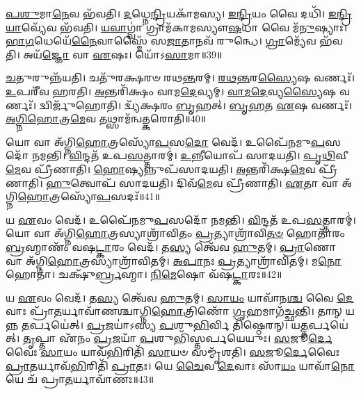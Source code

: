 \-\ul{𑌪}\-\-\ul{𑌶𑍁}\-𑌮𑌾\-\ul{𑌨𑍇}\-𑌵 𑌭᳴𑌵𑌤𑌿।
\-\ul{𑌦}\-𑌧𑍍𑌨𑍇\-\ul{𑌨𑍍𑌦𑍍𑌰𑌿}\-𑌯𑌕𑌾᳴𑌮𑌸𑍍𑌯।
\-\ul{𑌇}\-\-\ul{𑌨𑍍𑌦𑍍𑌰𑌿}\-𑌯𑌂 𑌵𑍈 𑌦𑌧𑌿᳴।
\-\ul{𑌇}\-\-\ul{𑌨𑍍𑌦𑍍𑌰𑌿}\-\-\ul{𑌯𑌾}\-𑌵𑍍𑌯𑍇᳴𑌵 𑌭᳴𑌵𑌤𑌿।
\-\ul{𑌯}\-\-\ul{𑌵𑌾}\-𑌗𑍍𑌵𑌾॑ 𑌗𑍍𑌰𑌾𑌮᳴𑌕𑌾𑌮𑌸𑍍𑌯𑍗\-\ul{𑌷}\-𑌧𑌾 𑌵𑍈 𑌮᳴\-\ul{𑌨𑍁}\-𑌷𑍍𑌯𑌾𑌃॑।
\-\ul{𑌭𑌾}\-\-\ul{𑌗}\-𑌧𑍇𑌯𑍇᳴\-\ul{𑌨𑍈}\-𑌵𑌾𑌸𑍍𑌮𑍈᳴ 𑌸\-\ul{𑌜𑌾}\-𑌤𑌾𑌨𑌵᳴ 𑌰𑍁𑌨𑍍𑌧𑍇।
\-\ul{𑌗𑍍𑌰𑌾}\-𑌮𑍍𑌯𑍇᳴𑌵 𑌭᳴𑌵𑌤𑌿।
𑌅𑌯᳴\-\ul{𑌜𑍍𑌞𑍋} 𑌵𑌾 \ul{𑌏}\-𑌷𑌃।
𑌯𑍋᳴𑌽\-\ul{𑌸𑌾}\-𑌮𑌾॥39॥

\-\ul{𑌚}\-𑌤𑍁𑌰𑍁𑌨𑍍𑌨᳴𑌯𑌤𑌿।
𑌚𑌤𑍁᳴𑌰𑌕𑍍𑌷𑌰𑍞 𑌰𑌥\-\ul{𑌨𑍍𑌤}\-𑌰𑌮𑍍।
\-\ul{𑌰}\-\-\ul{𑌥}\-\-\ul{𑌨𑍍𑌤}\-𑌰\-\ul{𑌸𑍍𑌯𑍈}\-𑌷 𑌵𑌰𑍍𑌣𑌃᳴।
\-\ul{𑌉}\-𑌪𑌰𑍀᳴𑌵 𑌹𑌰𑌤𑌿।
\-\ul{𑌅}\-𑌨𑍍𑌤𑌰𑌿᳴𑌕𑍍𑌷𑌂 𑌵𑌾𑌮\-\ul{𑌦𑍇}\-𑌵𑍍𑌯𑌮𑍍।
\-\ul{𑌵𑌾}\-\-\ul{𑌮}\-\-\ul{𑌦𑍇}\-𑌵𑍍𑌯\-\ul{𑌸𑍍𑌯𑍈}\-𑌷 𑌵𑌰𑍍𑌣𑌃᳴।
𑌦𑍍𑌵𑌿𑌰𑍍𑌜𑍁᳴𑌹𑍋𑌤𑌿।
𑌦𑍍𑌵𑍍𑌯᳴𑌕𑍍𑌷𑌰𑌂 \ul{𑌬𑍃}\-𑌹𑌤𑍍।
\-\ul{𑌬𑍃}\-\-\ul{𑌹}\-𑌤 \ul{𑌏}\-𑌷 𑌵𑌰𑍍𑌣𑌃᳴।
\-\ul{𑌅}\-\-\ul{𑌗𑍍𑌨𑌿}\-\-\ul{𑌹𑍋}\-𑌤𑍍𑌰\-\ul{𑌮𑍇}\-𑌵 𑌤𑌥𑍍𑌸𑌾𑌮᳴𑌨𑍍𑌵𑌤𑍍𑌕𑌰𑍋𑌤𑌿॥40॥

𑌯𑍋 𑌵𑌾 𑌅᳴𑌗𑍍𑌨𑌿\-\ul{𑌹𑍋}\-𑌤𑍍𑌰𑌸𑍍𑌯𑍋᳴\-\ul{𑌪}\-𑌸\-\ul{𑌦𑍋} 𑌵𑍇𑌦᳴।
𑌉𑌪𑍈᳴𑌨𑌮𑍁\-\ul{𑌪}\-𑌸𑌦𑍋᳴ 𑌨𑌮𑌨𑍍𑌤𑌿।
\-\ul{𑌵𑌿}\-𑌨𑍍𑌦𑌤᳴ 𑌉𑌪\-\ul{𑌸}\-𑌤𑍍𑌤𑌾𑌰𑌮𑍍॑।
\-\ul{𑌉}\-𑌨𑍍𑌨𑍀𑌯𑍋𑌪᳴ 𑌸𑌾𑌦𑌯𑌤𑌿।
\-\ul{𑌪𑍃}\-\-\ul{𑌥𑌿}\-𑌵𑍀\-\ul{𑌮𑍇}\-𑌵 𑌪𑍍𑌰𑍀᳴𑌣𑌾𑌤𑌿।
\-\ul{𑌹𑍋}\-𑌷𑍍𑌯𑌨𑍍𑌨𑍁𑌪᳴𑌸𑌾𑌦𑌯𑌤𑌿।
\-\ul{𑌅}\-𑌨𑍍𑌤𑌰𑌿᳴𑌕𑍍𑌷\-\ul{𑌮𑍇}\-𑌵 𑌪𑍍𑌰𑍀᳴𑌣𑌾𑌤𑌿।
\-\ul{𑌹𑍁}\-𑌤𑍍𑌵𑍋𑌪᳴ 𑌸𑌾𑌦𑌯𑌤𑌿।
𑌦𑌿𑌵᳴\-\ul{𑌮𑍇}\-𑌵 𑌪𑍍𑌰𑍀᳴𑌣𑌾𑌤𑌿।
\-\ul{𑌏}\-𑌤𑌾 𑌵𑌾 𑌅᳴𑌗𑍍𑌨𑌿\-\ul{𑌹𑍋}\-𑌤𑍍𑌰𑌸𑍍𑌯𑍋᳴\-\ul{𑌪}\-𑌸𑌦𑌃᳴॥41॥

𑌯 \ul{𑌏}\-𑌵𑌂 𑌵𑍇𑌦᳴।
𑌉𑌪𑍈᳴𑌨𑌮𑍁\-\ul{𑌪}\-𑌸𑌦𑍋᳴ 𑌨𑌮𑌨𑍍𑌤𑌿।
\-\ul{𑌵𑌿}\-𑌨𑍍𑌦𑌤᳴ 𑌉𑌪\-\ul{𑌸}\-𑌤𑍍𑌤𑌾𑌰𑌮𑍍॑।
𑌯𑍋 𑌵𑌾 𑌅᳴𑌗𑍍𑌨𑌿\-\ul{𑌹𑍋}\-𑌤𑍍𑌰𑌸𑍍𑌯𑌾𑌶𑍍𑌰𑌾᳴𑌵𑌿𑌤𑌂 \ul{𑌪𑍍𑌰}\-𑌤𑍍𑌯𑌾𑌶𑍍𑌰𑌾᳴𑌵𑌿\-\ul{𑌤}\-\-\ul{𑍞} 𑌹𑍋𑌤𑌾᳴𑌰𑌂 \ul{𑌬𑍍𑌰}\-𑌹𑍍𑌮𑌾𑌣𑌂᳴ 𑌵𑌷\-\ul{𑌟𑍍𑌕𑌾}\-𑌰𑌂 𑌵𑍇𑌦᳴।
𑌤\-\ul{𑌸𑍍𑌯} 𑌤𑍍𑌵𑍇᳴𑌵 \ul{𑌹𑍁}\-𑌤𑌮𑍍।
\-\ul{𑌪𑍍𑌰𑌾}\-𑌣𑍋 𑌵𑌾 𑌅᳴𑌗𑍍𑌨𑌿\-\ul{𑌹𑍋}\-𑌤𑍍𑌰𑌸𑍍𑌯𑌾𑌶𑍍𑌰𑌾᳴𑌵𑌿𑌤𑌮𑍍।
\-\ul{𑌅}\-\-\ul{𑌪𑌾}\-𑌨𑌃 \ul{𑌪𑍍𑌰}\-𑌤𑍍𑌯𑌾𑌶𑍍𑌰𑌾᳴𑌵𑌿𑌤𑌮𑍍।
𑌮\-\ul{𑌨𑍋} 𑌹𑍋𑌤𑌾॑।
𑌚𑌕𑍍𑌷𑍁᳴\-\ul{𑌰𑍍𑌬𑍍𑌰}\-𑌹𑍍𑌮𑌾।
\-\ul{𑌨𑌿}\-\-\ul{𑌮𑍇}\-𑌷𑍋 𑌵᳴𑌷\-\ul{𑌟𑍍𑌕𑌾}\-𑌰𑌃॥42॥

𑌯 \ul{𑌏}\-𑌵𑌂 𑌵𑍇𑌦᳴।
𑌤\-\ul{𑌸𑍍𑌯} 𑌤𑍍𑌵𑍇᳴𑌵 \ul{𑌹𑍁}\-𑌤𑌮𑍍।
\-\ul{𑌸𑌾}\-\-\ul{𑌯𑌂} 𑌯𑌾𑌵𑌾᳴𑌨\-\ul{𑌶𑍍𑌚} 𑌵𑍈 \ul{𑌦𑍇}\-𑌵𑌾𑌃 𑌪𑍍𑌰𑌾᳴\-\ul{𑌤}\-𑌰𑍍𑌯𑌾𑌵𑌾᳴𑌣𑌶𑍍𑌚𑌾𑌗𑍍𑌨𑌿\-\ul{𑌹𑍋}\-𑌤𑍍𑌰𑌿𑌣𑍋᳴ \ul{𑌗𑍃}\-𑌹𑌮𑌾𑌗᳴𑌚𑍍𑌛𑌨𑍍𑌤𑌿।
𑌤𑌾𑌨𑍍 𑌯𑌨𑍍𑌨 \ul{𑌤}\-𑌰𑍍𑌪𑌯𑍇॑𑌤𑍍।
\-\ul{𑌪𑍍𑌰}\-𑌜𑌯𑌾॑𑌽𑌸𑍍𑌯 \ul{𑌪}\-𑌶𑍁\-\ul{𑌭𑌿}\-𑌰𑍍𑌵𑌿 𑌤𑌿᳴𑌷𑍍𑌠𑍇𑌰𑌨𑍍।
𑌯\-\ul{𑌤𑍍𑌤}\-𑌰𑍍𑌪𑌯𑍇॑𑌤𑍍।
\-\ul{𑌤𑍃}\-𑌪𑍍𑌤𑌾 𑌏᳴𑌨𑌂 \ul{𑌪𑍍𑌰}\-𑌜𑌯𑌾᳴ \ul{𑌪}\-𑌶𑍁𑌭𑌿᳴𑌸𑍍𑌤𑌰𑍍𑌪𑌯𑍇𑌯𑍁𑌃।
\-\ul{𑌸}\-𑌜𑍂\-\ul{𑌰𑍍𑌦𑍇}\-𑌵𑍈𑌃 \ul{𑌸𑌾}\-𑌯𑌂 𑌯𑌾𑌵᳴\-\ul{𑌭𑌿}\-𑌰𑌿𑌤𑌿᳴ \ul{𑌸𑌾}\-𑌯𑍞 𑌸𑌮𑍍𑌮𑍃᳴𑌶𑌤𑌿।
\-\ul{𑌸}\-𑌜𑍂\-\ul{𑌰𑍍𑌦𑍇}\-𑌵𑍈𑌃 \ul{𑌪𑍍𑌰𑌾}\-𑌤𑌰𑍍𑌯𑌾𑌵᳴\-\ul{𑌭𑌿}\-𑌰𑌿𑌤𑌿᳴ \ul{𑌪𑍍𑌰𑌾}\-𑌤𑌃।
𑌯𑍇 \ul{𑌚𑍈}\-𑌵 \ul{𑌦𑍇}\-𑌵𑌾𑌃 𑌸𑌾᳴\-\ul{𑌯𑌂} 𑌯𑌾𑌵𑌾᳴\-\ul{𑌨𑍋} 𑌯𑍇 𑌚᳴ 𑌪𑍍𑌰𑌾\-\ul{𑌤}\-𑌰𑍍𑌯𑌾𑌵𑌾᳴𑌣𑌃॥43॥

